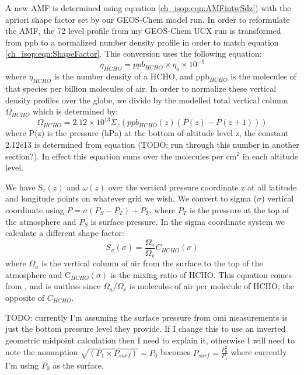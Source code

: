     A new AMF is determined using equation \ref{ch_isop:eqn:AMFintwSdz}) with the apriori shape factor set by our GEOS-Chem model run.
    In order to reformulate the AMF, the 72 level profile from my GEOS-Chem UCX run is transformed from ppb to a normalized number density profile in order to match equation \ref{ch_isop:eqn:ShapeFactor}. 
    This conversion uses the following equation: 
    \begin{equation} \label{ch_isop:eqn:ppbto}
      \eta_{HCHO} = ppb_{HCHO} \times \eta_a \times 10^{-9}
    \end{equation}
    where $\eta_{HCHO}$ is the number density of a HCHO, and ppb$_{HCHO}$ is the molecules of that species per billion molecules of air.
    In order to normalize these vertical density profiles over the globe, we divide by the modelled total vertical column $\Omega_{HCHO}$ which is determined by:
    \begin{equation*}
      \Omega_{HCHO} = 2.12\times 10^{13} \Sigma_z \left( ppb_{HCHO}(z) (P(z)-P(z+1)) \right)
    \end{equation*}
    where P(z) is the pressure (hPa) at the bottom of altitude level z, the constant 2.12e13 is determined from equation (TODO: run through this number in another section?).
    In effect this equation sums over the molecules per cm$^2$ in each altitude level.
    
    We have S$_z(z)$ and $\omega(z)$ over the vertical pressure coordinate z at all latitude and longitude points on whatever grid we wish. 
    We convert to sigma ($\sigma$) vertical coordinate using $ P = \sigma (P_S - P_T) + P_T$, where $P_T$ is the pressure at the top of the atmosphere and $P_S$ is surface pressure.
    In the sigma coordinate system we calculate a different shape factor:
    \begin{equation} \label{ch_isop:eqn:ShapeFactorSigma}
      S_\sigma(\sigma) = \frac{\Omega_a}{\Omega_v}C_{HCHO}(\sigma)
    \end{equation}
    where $\Omega_a$ is the vertical column of air from the surface to the top of the atmosphere and C$_{HCHO}(\sigma)$ is the mixing ratio of HCHO.
    This equation comes from \citet{Palmer2001}, and is unitless since $\Omega_a / \Omega_v$ is molecules of air per molecule of HCHO; the opposite of $C_{HCHO}$.

    TODO: currently I'm assuming the surface pressure from omi measurements is just the bottom pressure level they provide.
    If I change this to use an inverted geometric midpoint calculation then I need to explain it, otherwise I will need to note the assumption
    $ \sqrt{ \left( P_1 \times P_{surf} \right)} = P_0 $
    becomes $ P_{surf} = \frac{P_0^2}{P_1} $ where currently I'm using $P_0$ as the surface.

